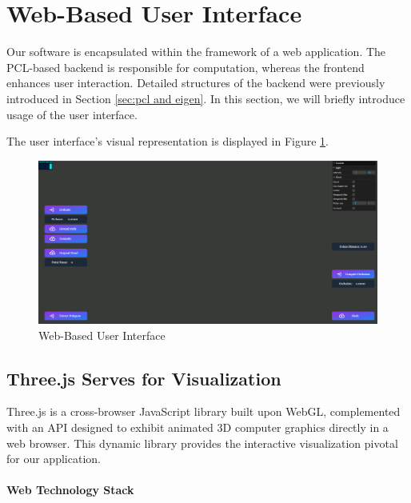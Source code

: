 \documentclass[11pt, a4paper,oneside,chapterprefix=false]{scrbook}
\begin{document}
\section{Web-Based User Interface} \label{sec:three.js}

Our software is encapsulated within the framework of a web application. The PCL-based backend is responsible for computation, whereas the frontend enhances user interaction. Detailed structures of the backend were previously introduced in Section \ref{sec:pcl and eigen}. In this section, we will briefly introduce usage of the user interface.

\vspace{10pt}

The user interface's visual representation is displayed in Figure \ref{fig:web user interface}.

\begin{figure}[H]
	\centering
	\includegraphics*[width=1.0\textwidth]{figures/ui.png}
	\caption{Web-Based User Interface}
	\label{fig:web user interface}
\end{figure}

\subsection{Three.js Serves for Visualization}

Three.js \cite{threejs} is a cross-browser JavaScript library built upon WebGL, complemented with an API designed to exhibit animated 3D computer graphics directly in a web browser. This dynamic library provides the interactive visualization pivotal for our application. 

\paragraph{Web Technology Stack}
\end{document}
